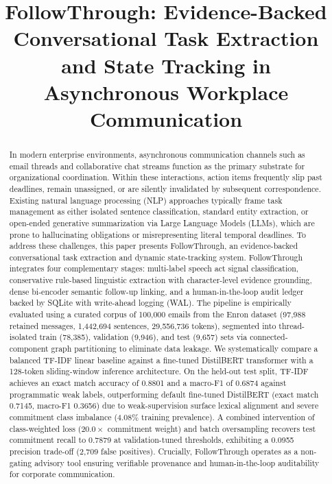 \documentclass[conference]{IEEEtran}
\begin{document}
\title{FollowThrough: Evidence-Backed Conversational Task Extraction and State Tracking in Asynchronous Workplace Communication}

\author{
}

\maketitle

\begin{abstract}
In modern enterprise environments, asynchronous communication channels such as email threads and collaborative chat streams function as the primary substrate for organizational coordination. Within these interactions, action items frequently slip past deadlines, remain unassigned, or are silently invalidated by subsequent correspondence. Existing natural language processing (NLP) approaches typically frame task management as either isolated sentence classification, standard entity extraction, or open-ended generative summarization via Large Language Models (LLMs), which are prone to hallucinating obligations or misrepresenting literal temporal deadlines. To address these challenges, this paper presents FollowThrough, an evidence-backed conversational task extraction and dynamic state-tracking system. FollowThrough integrates four complementary stages: multi-label speech act signal classification, conservative rule-based linguistic extraction with character-level evidence grounding, dense bi-encoder semantic follow-up linking, and a human-in-the-loop audit ledger backed by SQLite with write-ahead logging (WAL). The pipeline is empirically evaluated using a curated corpus of 100,000 emails from the Enron dataset (97,988 retained messages, 1,442,694 sentences, 29,556,736 tokens), segmented into thread-isolated train (78,385), validation (9,946), and test (9,657) sets via connected-component graph partitioning to eliminate data leakage. We systematically compare a balanced TF-IDF linear baseline against a fine-tuned DistilBERT transformer with a 128-token sliding-window inference architecture. On the held-out test split, TF-IDF achieves an exact match accuracy of 0.8801 and a macro-F1 of 0.6874 against programmatic weak labels, outperforming default fine-tuned DistilBERT (exact match 0.7145, macro-F1 0.3656) due to weak-supervision surface lexical alignment and severe commitment class imbalance (4.08\% training prevalence). A combined intervention of class-weighted loss ($20.0\times$ commitment weight) and batch oversampling recovers test commitment recall to 0.7879 at validation-tuned thresholds, exhibiting a 0.0955 precision trade-off (2,709 false positives). Crucially, FollowThrough operates as a non-gating advisory tool ensuring verifiable provenance and human-in-the-loop auditability for corporate communication.
\end{abstract}
\end{document}
